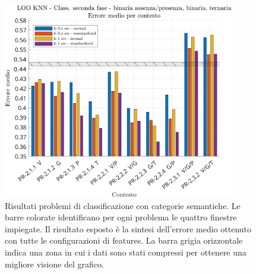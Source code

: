 \begin{center}	
	\begin{figure}[htp]
		\centering
		\includegraphics[width=0.9\textwidth]{img/cap4-classificazione_fase2_problemi.jpg}
		\caption{Risultati problemi di classificazione con categorie semantiche. Le barre colorate identificano per
			ogni problema le quattro finestre impiegate. Il risultato esposto è la sintesi dell’errore medio ottenuto con tutte
			le configurazioni di features. La barra grigia orizzontale indica una zona in cui i dati sono stati compressi per
			ottenere una migliore visione del grafico.}
		\label{fig4.5}
	\end{figure}
\end{center}	
